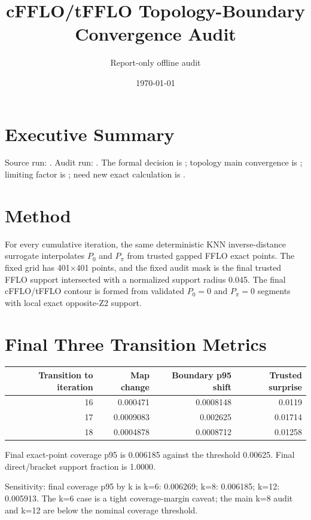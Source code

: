 \documentclass[11pt]{article}
\title{cFFLO/tFFLO Topology-Boundary Convergence Audit}
\author{Report-only offline audit}
\date{\today}
\begin{document}
\sloppy
\maketitle

\section{Executive Summary}
Source run: \texttt{}.  Audit run: \texttt{}.
The formal decision is \texttt{}; topology main
convergence is \texttt{}; limiting
factor is \texttt{}; need new exact calculation
is \texttt{}.

\section{Method}
For every cumulative iteration, the same deterministic KNN inverse-distance
surrogate interpolates $P_0$ and $P_\pi$ from trusted gapped FFLO exact points.
The fixed grid has 401$\times$401 points, and the fixed audit mask is
the final trusted FFLO support intersected with a normalized support radius
0.045.  The final cFFLO/tFFLO contour is formed from validated
$P_0=0$ and $P_\pi=0$ segments with local exact opposite-Z2 support.

\section{Final Three Transition Metrics}
\begin{center}
\begin{tabular}{rrrr}
\toprule
Transition to iteration & Map change & Boundary p95 shift & Trusted surprise \\
\midrule
16 & 0.000471 & 0.0008148 & 0.0119 \\
17 & 0.0009083 & 0.002625 & 0.01714 \\
18 & 0.0004878 & 0.0008712 & 0.01258 \\
\bottomrule
\end{tabular}
\end{center}

Final exact-point coverage p95 is 0.006185 against the
threshold 0.00625.  Final direct/bracket support fraction is
1.0000.

Sensitivity: final coverage p95 by k is k=6: 0.006269; k=8: 0.006185; k=12: 0.005913.  The k=6 case is a
tight coverage-margin caveat; the main k=8 audit and k=12 are below the
nominal coverage threshold.
\end{document}

